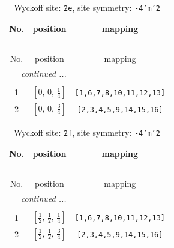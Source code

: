 \documentclass[fleqn,8pt]{jsarticle}
\begin{document}
\begin{longtable}{ccc}
\caption{Wyckoff site: {\tt 2e}, site symmetry: {\tt -4'm'2}}
 \\
 \hline \hline
No. & position & mapping \\ \hline \endfirsthead

\multicolumn{2}{l}{\tablename\ \thetable{}} \\
 \hline \hline
No. & position & mapping \\ \hline \endhead

 \hline \hline
\multicolumn{2}{r}{\footnotesize\it continued ...} \\ \endfoot

 \hline \hline
\multicolumn{2}{r}{} \\ \endlastfoot

1 & $\left[ 0,\, 0,\, \frac{1}{4} \right]$ & {\tt [1,6,7,8,10,11,12,13]} \\ \hline
2 & $\left[ 0,\, 0,\, \frac{3}{4} \right]$ & {\tt [2,3,4,5,9,14,15,16]} \\
\end{longtable}
\renewcommand{\arraystretch}{1.2}
\begin{longtable}{ccc}
\caption{Wyckoff site: {\tt 2f}, site symmetry: {\tt -4'm'2}}
 \\
 \hline \hline
No. & position & mapping \\ \hline \endfirsthead

\multicolumn{2}{l}{\tablename\ \thetable{}} \\
 \hline \hline
No. & position & mapping \\ \hline \endhead

 \hline \hline
\multicolumn{2}{r}{\footnotesize\it continued ...} \\ \endfoot

 \hline \hline
\multicolumn{2}{r}{} \\ \endlastfoot

1 & $\left[ \frac{1}{2},\, \frac{1}{2},\, \frac{1}{4} \right]$ & {\tt [1,6,7,8,10,11,12,13]} \\ \hline
2 & $\left[ \frac{1}{2},\, \frac{1}{2},\, \frac{3}{4} \right]$ & {\tt [2,3,4,5,9,14,15,16]} \\
\end{longtable}
\renewcommand{\arraystretch}{1.2}
\end{document}
